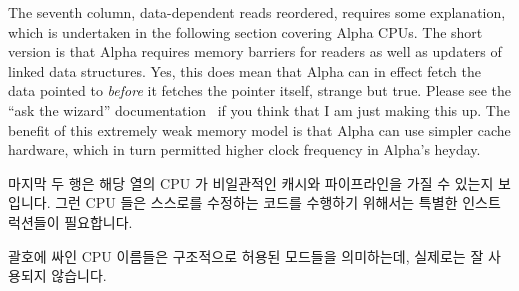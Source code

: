 The seventh column, data-dependent reads reordered, requires some explanation,
which is undertaken in the following section covering Alpha CPUs.
The short version is that Alpha requires memory barriers for readers
as well as updaters of linked data structures.
Yes, this does mean that Alpha can in effect fetch
the data pointed to {\em before} it fetches the pointer itself, strange
but true.
Please see the ``ask the wizard'' documentation~\cite{Compaq01}
if you think that I am just making this up.
The benefit of this extremely weak memory model is that Alpha can use
simpler cache hardware, which in turn permitted higher clock frequency
in Alpha's heyday.
\fi

마지막 두 행은 해당 열의 CPU 가 비일관적인 캐시와 파이프라인을 가질 수 있는지
보입니다.
그런 CPU 들은 스스로를 수정하는 코드를 수행하기 위해서는 특별한 인스트럭션들이
필요합니다.

괄호에 싸인 CPU 이름들은 구조적으로 허용된 모드들을 의미하는데, 실제로는 잘
사용되지 않습니다.

